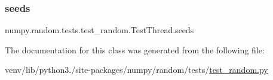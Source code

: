 \subsubsection{\texorpdfstring{seeds}{seeds}}
{\footnotesize\ttfamily numpy.\+random.\+tests.\+test\+\_\+random.\+Test\+Thread.\+seeds}



The documentation for this class was generated from the following file\+:\begin{DoxyCompactItemize}
\item 
venv/lib/python3./site-\/packages/numpy/random/tests/\hyperlink{test__random_8py}{test\+\_\+random.\+py}\end{DoxyCompactItemize}
